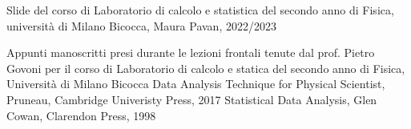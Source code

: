 \documentclass[11pt,a4paper]{book}
\begin{document}

\tableofcontents

\begin{thebibliography}{4}

 Slide del corso di Laboratorio di calcolo e statistica del secondo anno di Fisica, universit\`{a} di Milano Bicocca, Maura Pavan, 2022/2023

 Appunti manoscritti presi durante le lezioni frontali tenute dal prof. Pietro Govoni per il corso di Laboratorio di calcolo e statica del secondo anno di Fisica, Universit\`{a} di Milano Bicocca
 Data Analysis Technique for Physical Scientist, Pruneau, Cambridge Univeristy Press, 2017
 Statistical Data Analysis, Glen Cowan, Clarendon Press, 1998

\end{thebibliography}








\end{document}

